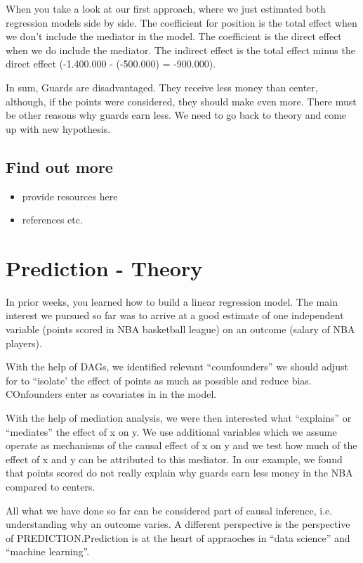 \documentclass[
]{book}
\providecommand{\tightlist}{%
  \setlength{\itemsep}{0pt}\setlength{\parskip}{0pt}}
\begin{document}
When you take a look at our first approach, where we just estimated both regression models side by side. The coefficient for position is the total effect when we don't include the
mediator in the model. The coefficient is the direct effect when we do include the mediator.
The indirect effect is the total effect minus the direct effect (-1.400.000 - (-500.000) = -900.000).

In sum, Guards are disadvantaged. They receive less money than center, although, if the points were considered, they should make even more. There must be other reasons why guards earn less. We need to go back to theory and come up with new hypothesis.

\hypertarget{find-out-more}{%
\section{Find out more}\label{find-out-more}}

\begin{itemize}
\tightlist
\item
  provide resources here
\item
  references etc.
\end{itemize}

\hypertarget{pm-t}{%
\chapter{Prediction - Theory}\label{pm-t}}

In prior weeks, you learned how to build a linear regression model. The main interest
we pursued so far was to arrive at a good estimate of one independent variable (points scored in NBA basketball league) on an outcome (salary of NBA players).

With the help of DAGs, we identified relevant ``counfounders'' we should adjust for to ``isolate' the effect of points as much as possible and reduce bias. COnfounders enter as covariates in in the model.

With the help of mediation analysis, we were then interested what ``explains'' or ``mediates'' the effect of x on y. We use additional variables which we assume operate as mechanisms of the causal effect of x on y and we test how much of the effect of x and y can be attributed to this mediator. In our example, we found that points scored do not really explain why guards earn less money in the NBA compared to centers.

All what we have done so far can be considered part of causal inference, i.e.
understanding why an outcome varies. A different perspective is the perspective of PREDICTION.Prediction is at the heart of appraoches in ``data science'' and ``machine learning''.
\end{document}
